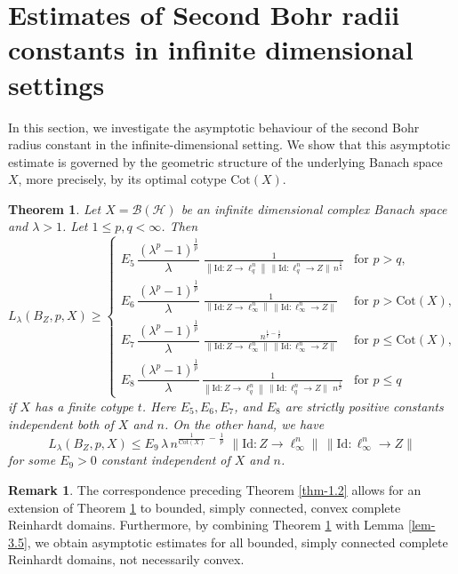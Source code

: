 \documentclass[a4paper,11pt, reqno]{amsart}
\newtheorem{thm}{Theorem}[section]
\theoremstyle{definition}
\newtheorem{rem}{Remark}[section]
\newcommand{\norm}[1]{\left\lVert#1\right\rVert}
\begin{document}
\section{Estimates of Second Bohr radii constants in infinite dimensional settings}
In this section, we investigate the asymptotic behaviour of the second Bohr radius constant in the infinite-dimensional setting. 
We show that this asymptotic estimate is governed by the geometric structure of the underlying Banach space $X$, more precisely, by its optimal cotype $\mathrm{Cot}(X)$.
\begin{thm} \label{thm-4.1}
	Let $X=\mathcal{B}(\mathcal{H})$ be an infinite dimensional complex Banach space  and $\lambda>1$. Let $1 \leq p,q < \infty$. Then 
	\begin{equation*}
		L_{\lambda}(B_{Z}, p,X) \geq	\begin{cases}
				E_{5}\, \dfrac{\left(\lambda^p -1\right)^{\frac{1}{p}}}{\lambda}\, \,  \frac{1}{ \norm{\mathrm{Id}: Z \rightarrow \ell^n_q}\,\|\mathrm{Id}:\ell_q^n\to Z\|\, n^{\frac{1}{q}}} & \text{for $p > q$}, \\[2mm]
			
			E_{6}\,\dfrac{\left(\lambda^p -1\right)^{\frac{1}{p}}}{\lambda}\, \,  \frac{1}{ \norm{\mathrm{Id}: Z \rightarrow \ell^n_\infty}\,\|\mathrm{Id}:\ell_\infty^n\to Z\|} & \text{for $p>\mathrm{Cot}(X)$}, \\[2mm]
			E_{7}\, \dfrac{\left(\lambda^p -1\right)^{\frac{1}{p}}}{\lambda}\,  \, \frac{ n^{\frac{1}{t}-\frac{1}{p}}}{\|\mathrm{Id}: Z\to \ell_\infty^n\|\,\|\mathrm{Id}:\ell_\infty^n\to Z\|} & \text{for $p\leq  \mathrm{Cot}(X)$},\\[2mm]
			E_{8}\, \dfrac{\left(\lambda^p -1\right)^{\frac{1}{p}}}{\lambda}\,   \frac{1}{ \norm{\mathrm{Id}: Z \rightarrow \ell^n_q}\,\|\mathrm{Id}:\ell_q^n\to Z\|\, \, n^{\frac{1}{p}}} & \text{for $p \leq q$}
		\end{cases}
	\end{equation*}
	if $X$ has a finite cotype $t$. Here $E_{5},E_{6},E_{7}$, and $E_{8}$ are strictly positive constants independent both of $X$ and $n$. 
	On the other hand, we have
	\begin{equation*}
		L_{\lambda}(B_{Z}, p,X) \leq 	
			E_9\,\lambda\, n^{\frac{1}{\mathrm{Cot}(X)}\, - \,\frac{1}{p}}\,\, \| \mathrm{Id}: Z \to \ell_\infty^n \|\, \|\mathrm{Id}: \ell_\infty^n \to Z\| 
	\end{equation*}
for some $E_9>0$ constant independent of $X$ and $n$.
\end{thm}
\begin{rem}
	The correspondence preceding Theorem \ref{thm-1.2} allows for an extension of Theorem \ref{thm-4.1} to bounded, simply connected, convex complete Reinhardt domains. Furthermore, by combining Theorem \ref{thm-4.1} with Lemma \ref{lem-3.5}, we obtain asymptotic estimates for all bounded, simply connected complete Reinhardt domains, not necessarily convex. 
\end{rem}
\end{document}
